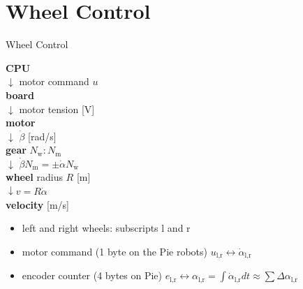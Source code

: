 \documentclass{beamer}
\begin{document}
\section{Wheel Control}
\begin{frame}{Wheel Control}
  
  \begin{minipage}{0.3\columnwidth}
    \textbf{CPU}\\
    $\downarrow$ motor command $u$\\
    \textbf{board}\\
    $\downarrow$ motor tension [V]\\
    \textbf{motor}\\
    $\downarrow$ $\dot\beta$ [rad/s]\\
    \textbf{gear} $N_\text{w}:N_\text{m}$\\
    $\downarrow$ $\dot\beta N_\text{m} = \pm \dot\alpha N_\text{w}$\\
    \textbf{wheel} radius $R$ [m]\\
    $\downarrow v = R \dot\alpha$\\
    \textbf{velocity} [m/s]
  \end{minipage}
  \hfill
  \begin{minipage}{0.65\columnwidth}    
    \def\svgwidth{\columnwidth}
    
  \end{minipage}
  
  \vfill
  
  \begin{itemize}
  \item
    left and right wheels: subscripts l and r
  \item
    motor command (1 byte on the Pie robots) $u_\text{l,r} \leftrightarrow \dot\alpha_\text{l,r}$
  \item
    encoder counter (4 bytes on Pie) $e_\text{l,r} \leftrightarrow \alpha_\text{l,r} = \int \dot\alpha_\text{l,r} dt \approx \sum\Delta\alpha_\text{l,r}$
  \end{itemize}
  
\end{frame}
\end{document}

